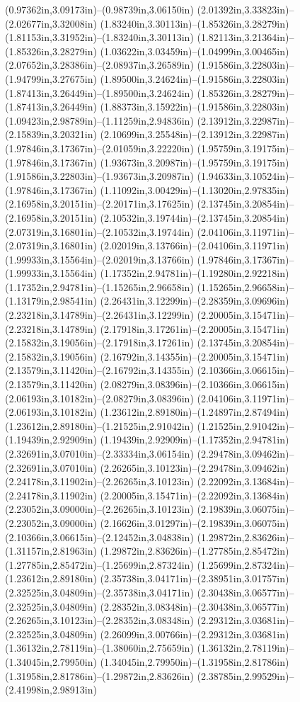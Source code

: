 (0.97362in,3.09173in)--(0.98739in,3.06150in) (2.01392in,3.33823in)--(2.02677in,3.32008in) (1.83240in,3.30113in)--(1.85326in,3.28279in) (1.81153in,3.31952in)--(1.83240in,3.30113in) (1.82113in,3.21364in)--(1.85326in,3.28279in) (1.03622in,3.03459in)--(1.04999in,3.00465in) (2.07652in,3.28386in)--(2.08937in,3.26589in) (1.91586in,3.22803in)--(1.94799in,3.27675in) (1.89500in,3.24624in)--(1.91586in,3.22803in) (1.87413in,3.26449in)--(1.89500in,3.24624in) (1.85326in,3.28279in)--(1.87413in,3.26449in) (1.88373in,3.15922in)--(1.91586in,3.22803in) (1.09423in,2.98789in)--(1.11259in,2.94836in) (2.13912in,3.22987in)--(2.15839in,3.20321in) (2.10699in,3.25548in)--(2.13912in,3.22987in) (1.97846in,3.17367in)--(2.01059in,3.22220in) (1.95759in,3.19175in)--(1.97846in,3.17367in) (1.93673in,3.20987in)--(1.95759in,3.19175in) (1.91586in,3.22803in)--(1.93673in,3.20987in) (1.94633in,3.10524in)--(1.97846in,3.17367in) (1.11092in,3.00429in)--(1.13020in,2.97835in) (2.16958in,3.20151in)--(2.20171in,3.17625in) (2.13745in,3.20854in)--(2.16958in,3.20151in) (2.10532in,3.19744in)--(2.13745in,3.20854in) (2.07319in,3.16801in)--(2.10532in,3.19744in) (2.04106in,3.11971in)--(2.07319in,3.16801in) (2.02019in,3.13766in)--(2.04106in,3.11971in) (1.99933in,3.15564in)--(2.02019in,3.13766in) (1.97846in,3.17367in)--(1.99933in,3.15564in) (1.17352in,2.94781in)--(1.19280in,2.92218in) (1.17352in,2.94781in)--(1.15265in,2.96658in) (1.15265in,2.96658in)--(1.13179in,2.98541in) (2.26431in,3.12299in)--(2.28359in,3.09696in) (2.23218in,3.14789in)--(2.26431in,3.12299in) (2.20005in,3.15471in)--(2.23218in,3.14789in) (2.17918in,3.17261in)--(2.20005in,3.15471in) (2.15832in,3.19056in)--(2.17918in,3.17261in) (2.13745in,3.20854in)--(2.15832in,3.19056in) (2.16792in,3.14355in)--(2.20005in,3.15471in) (2.13579in,3.11420in)--(2.16792in,3.14355in) (2.10366in,3.06615in)--(2.13579in,3.11420in) (2.08279in,3.08396in)--(2.10366in,3.06615in) (2.06193in,3.10182in)--(2.08279in,3.08396in) (2.04106in,3.11971in)--(2.06193in,3.10182in) (1.23612in,2.89180in)--(1.24897in,2.87494in) (1.23612in,2.89180in)--(1.21525in,2.91042in) (1.21525in,2.91042in)--(1.19439in,2.92909in) (1.19439in,2.92909in)--(1.17352in,2.94781in) (2.32691in,3.07010in)--(2.33334in,3.06154in) (2.29478in,3.09462in)--(2.32691in,3.07010in) (2.26265in,3.10123in)--(2.29478in,3.09462in) (2.24178in,3.11902in)--(2.26265in,3.10123in) (2.22092in,3.13684in)--(2.24178in,3.11902in) (2.20005in,3.15471in)--(2.22092in,3.13684in) (2.23052in,3.09000in)--(2.26265in,3.10123in) (2.19839in,3.06075in)--(2.23052in,3.09000in) (2.16626in,3.01297in)--(2.19839in,3.06075in) (2.10366in,3.06615in)--(2.12452in,3.04838in) (1.29872in,2.83626in)--(1.31157in,2.81963in) (1.29872in,2.83626in)--(1.27785in,2.85472in) (1.27785in,2.85472in)--(1.25699in,2.87324in) (1.25699in,2.87324in)--(1.23612in,2.89180in) (2.35738in,3.04171in)--(2.38951in,3.01757in) (2.32525in,3.04809in)--(2.35738in,3.04171in) (2.30438in,3.06577in)--(2.32525in,3.04809in) (2.28352in,3.08348in)--(2.30438in,3.06577in) (2.26265in,3.10123in)--(2.28352in,3.08348in) (2.29312in,3.03681in)--(2.32525in,3.04809in) (2.26099in,3.00766in)--(2.29312in,3.03681in) (1.36132in,2.78119in)--(1.38060in,2.75659in) (1.36132in,2.78119in)--(1.34045in,2.79950in) (1.34045in,2.79950in)--(1.31958in,2.81786in) (1.31958in,2.81786in)--(1.29872in,2.83626in) (2.38785in,2.99529in)--(2.41998in,2.98913in) 